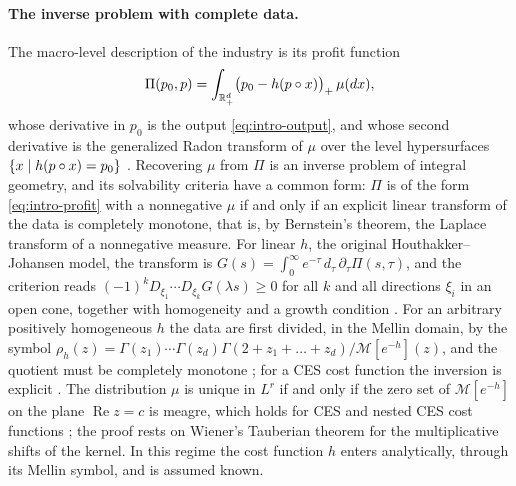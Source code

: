 \paragraph{The inverse problem with complete data.}
The macro-level description of the industry is its profit function
\begin{equation}\label{eq:intro-profit}
\Pi(p_0,p)=\int_{\Rp[d]}\bigl(p_0-h(p\circ x)\bigr)_+\,\mu(dx),
\end{equation}
whose derivative in $p_0$ is the output \eqref{eq:intro-output}, and whose second derivative is the generalized Radon transform of $\mu$ over the level hypersurfaces $\set{x\mid h(p\circ x)=p_0}$ \citep{Shananin1997b,AgaltsovMolchanovShananin2018}. Recovering $\mu$ from $\Pi$ is an inverse problem of integral geometry, and its solvability criteria have a common form: $\Pi$ is of the form \eqref{eq:intro-profit} with a nonnegative $\mu$ if and only if an explicit linear transform of the data is completely monotone, that is, by Bernstein's theorem, the Laplace transform of a nonnegative measure. For linear $h$, the original Houthakker--Johansen model, the transform is $G(s)=\int_0^\infty e^{-\tau}\,d_\tau\,\partial_\tau\Pi(s,\tau)$, and the criterion reads $(-1)^kD_{\xi_1}\cdots D_{\xi_k}G(\lambda s)\ge0$ for all $k$ and all directions $\xi_i$ in an open cone, together with homogeneity and a growth condition \citep{HenkinShananin1990}. For an arbitrary positively homogeneous $h$ the data are first divided, in the Mellin domain, by the symbol $\rho_h(z)=\Gamma(z_1)\cdots\Gamma(z_d)\Gamma(2+z_1+\dots+z_d)/\mathcal M[e^{-h}](z)$, and the quotient must be completely monotone \citep{Agaltsov2015}; for a CES cost function the inversion is explicit \citep[Prop.~4.1]{AgaltsovMolchanovShananin2018}. The distribution $\mu$ is unique in $L^r$ if and only if the zero set of $\mathcal M[e^{-h}]$ on the plane $\operatorname{Re}z=c$ is meagre, which holds for CES and nested CES cost functions \citep{Agaltsov2016}; the proof rests on Wiener's Tauberian theorem for the multiplicative shifts of the kernel. In this regime the cost function $h$ enters analytically, through its Mellin symbol, and is assumed known.


